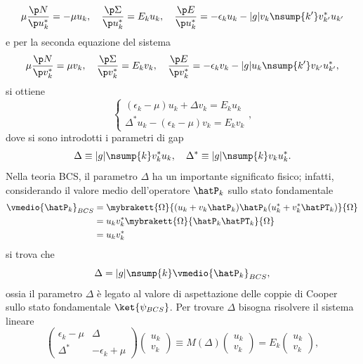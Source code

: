 \begin{equation}
    \mu\frac{\p N}{\p u_k^*} = -\mu u_k, \quad \frac{\p \Sigma}{\p u_k^*} = E_ku_k,\quad \frac{\p E}{\p u_k^*} = -\epsilon_ku_k - |g|v_k\nsump{k'}v_{k'}^*u_{k'}
\end{equation}
e per la seconda equazione del sistema
\begin{equation}
    \mu\frac{\p N}{\p v_k^*} = \mu v_k, \quad \frac{\p \Sigma}{\p v_k^*} = E_kv_k,\quad \frac{\p E}{\p v_k^*} = -\epsilon_kv_k - |g|u_k\nsump{k'}v_{k'}u_{k'}^*,
\end{equation}
si ottiene
\begin{equation}
    \begin{cases}
        (\epsilon_k - \mu)u_k + \Delta v_k = E_ku_k \\
        \Delta^*u_k - (\epsilon_k - \mu)v_k = E_kv_k
    \end{cases},
\end{equation}
dove si sono introdotti i parametri di gap
\begin{equation}
\label{eq: parametri di gap BCS definizione}
    \Delta \equiv |g|\nsump{k}v_k^*u_k,\quad \Delta^* \equiv |g|\nsump{k}v_ku_k^*.
\end{equation}
Nella teoria BCS, il parametro $\Delta$ ha un importante significato fisico; infatti, considerando il valore medio dell'operatore $\hatP_k$ sullo stato fondamentale 
\begin{equation}
    \begin{split}
        \vmedio{\hatP_k}_{BCS} &= \mybrakett{\Omega}{(u_k + v_k\hatP_k)\hatP_k(u_k^* + v_k^*\hatPT_k)}{\Omega} \\
        &= u_kv_k^*\mybrakett{\Omega}{\hatP_k\hatPT_k}{\Omega} \\
        &= u_kv_k^*
    \end{split}
\end{equation}
si trova che 
\begin{equation}
    \Delta = |g|\nsump{k}\vmedio{\hatP_k}_{BCS},
\end{equation}
ossia il parametro $\Delta$ è legato al valore di aspettazione delle coppie di Cooper sullo stato fondamentale $\ket{\psi_{BCS}}$. Per trovare $\Delta$ bisogna risolvere il sistema lineare
\begin{equation}
    \begin{pmatrix}
        \epsilon_k - \mu & \Delta \\
        \Delta^* & -\epsilon_k + \mu
    \end{pmatrix}
    \begin{pmatrix}
        u_k \\
        v_k
    \end{pmatrix} \equiv M(\Delta)
    \begin{pmatrix}
        u_k \\
        v_k
    \end{pmatrix} = E_k
    \begin{pmatrix}
        u_k \\
        v_k
    \end{pmatrix},
\end{equation}
